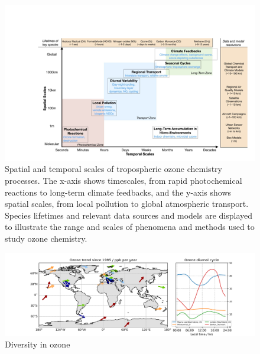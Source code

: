 \documentclass[gmd, manuscript]{copernicus}
\begin{document}
\begin{figure}
    \centering
    \includegraphics[width=1.05\linewidth]{figures/Figure0.png}
    \caption{Spatial and temporal scales of tropospheric ozone chemistry processes. The x-axis shows timescales, from rapid photochemical reactions to long-term climate feedbacks, and the y-axis shows spatial scales, from local pollution to global atmospheric transport. Species lifetimes and relevant data sources and models are displayed to illustrate the range and scales of phenomena and methods used to study ozone chemistry.}
    \label{fig:difficulties1}
\end{figure}
\begin{figure}
    \centering
    \includegraphics[width=1.05\linewidth]{figures/figure1.png}
    \caption{Diversity in ozone}
    \label{fig:difficulties2}
\end{figure}
\end{document}
